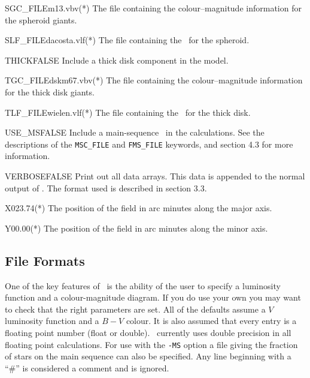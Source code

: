 \begin{key}{SGC\_FILE}{m13.vbv}{(*)}
The file containing the colour--magnitude information for the spheroid giants.
\end{key}

\begin{key}{SLF\_FILE}{dacosta.vlf}{(*)}
The file containing the \lf\ for the spheroid.
\end{key}

\begin{key}{THICK}{FALSE}{}
Include a thick disk component in the model.
\end{key}

\begin{key}{TGC\_FILE}{dskm67.vbv}{(*)}
The file containing the colour--magnitude information for the thick disk 
giants.
\end{key}

\begin{key}{TLF\_FILE}{wielen.vlf}{(*)}
The file containing the \lf\ for the thick disk.
\end{key}

\begin{key}{USE\_MS}{FALSE}{}
Include a main-sequence \cmd\ in the calculations. See the descriptions
of the {\tt MSC\_FILE} and {\tt FMS\_FILE} keywords, and section 4.3 for 
more information.
\end{key}

\begin{key}{VERBOSE}{FALSE}{}
Print out all data arrays. This data is appended to the normal output of
\egm. The format used is described in section 3.3.
\end{key}

\begin{key}{X0}{23.74}{(*)}
The position of the field in arc minutes along the major axis.
\end{key}

\begin{key}{Y0}{0.00}{(*)}
The position of the field in arc minutes along the minor axis.
\end{key}

\subsection{File Formats}

One of the key features of \egm\ is the  ability of the user  to specify a
luminosity function and a colour-magnitude diagram. If  you do use  your
own you may want to check that the right parameters are set.  All of the
defaults assume a $V$ luminosity function and a $B-V$  colour.  It is also
assumed that  every entry is a  floating point number (float or double).
\egm\ currently uses double precision in all floating point calculations.
For use with the {\tt -MS} option a file giving the fraction of stars on the
main sequence can also be specified. Any line beginning with a ``\#'' is 
considered a comment and is ignored.

